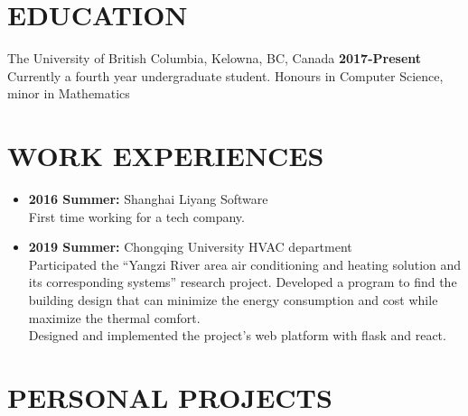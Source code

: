 \documentclass{res}
\begin{document}

\address{\textbf{Email:} jimmy123good@hotmail.com \\
        \textbf{Github: }https://github.com/ailrk \\
         \textbf{Blog:}    https://ailrk.github.io/home \\
         \textbf{Contact:}  (250) 899 2600}
\begin{resume}

\section{EDUCATION}
The University of British Columbia, Kelowna, BC, Canada  \hspace{1.2in} \textbf{2017-Present}\\
    Currently a fourth year undergraduate student. Honours in Computer Science, minor in Mathematics \\

\section{WORK EXPERIENCES}
\begin{itemize}[leftmargin=-.1in]
    \setlength\itemsep{-1em}
    \item \textbf{2016 Summer:} Shanghai Liyang Software
    \vspace{0.05in}\\
    First time working for a tech company. \\
    \item \textbf{2019 Summer:} Chongqing University HVAC department
        \vspace{0.05in}\\ Participated the ``Yangzi River area air conditioning and heating solution and its corresponding systems'' research project. Developed a program to find the building design that can minimize the energy consumption and cost while maximize the thermal comfort. \\
     Designed and implemented the project's web platform with flask and react. \\

\end{itemize}

\vspace{-0.2in}
\section{PERSONAL PROJECTS}


\end{resume}
\end{document}
